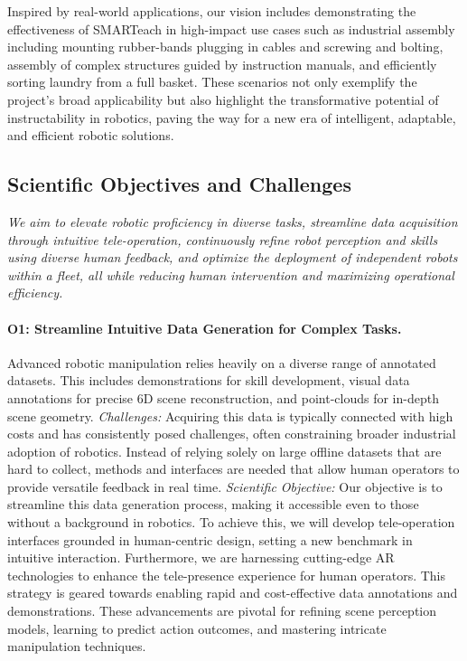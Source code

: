 \begin{refsection}
Inspired by real-world applications, our vision includes demonstrating the effectiveness of SMARTeach in high-impact use cases such as industrial assembly including mounting rubber-bands plugging in cables and screwing and bolting, assembly of complex structures guided by instruction manuals, and efficiently sorting laundry from a full basket. These scenarios not only exemplify the project's broad applicability but also highlight the transformative potential of instructability in robotics, paving the way for a new era of intelligent, adaptable, and efficient robotic solutions.

\subsection{Scientific Objectives and Challenges}
\textit{We aim to elevate robotic proficiency in diverse tasks, streamline data acquisition through intuitive tele-operation, continuously refine robot perception and skills using diverse human feedback, and optimize the deployment of independent robots within a fleet, all while reducing human intervention and maximizing operational efficiency.}
\vspace{-0.1cm}

\paragraph{O1: Streamline Intuitive Data Generation for Complex Tasks.} Advanced robotic manipulation relies heavily on a diverse range of annotated datasets. This includes demonstrations for skill development, visual data annotations for precise 6D scene reconstruction, and point-clouds for in-depth scene geometry. \newline
\textit{Challenges:} Acquiring this data is typically connected with high costs and has consistently posed challenges, often constraining broader industrial adoption of robotics. Instead of relying solely on large offline datasets that are hard to collect, methods and interfaces are needed that allow human operators to provide versatile feedback in real time.\newline
\textit{Scientific Objective:} Our objective is to streamline this data generation process, making it accessible even to those without a background in robotics. To achieve this, we will develop tele-operation interfaces grounded in human-centric design, setting a new benchmark in intuitive interaction. Furthermore, we are harnessing cutting-edge AR technologies to enhance the tele-presence experience for human operators. This strategy is geared towards enabling rapid and cost-effective data annotations and demonstrations. These advancements are pivotal for refining scene perception models, learning to predict action outcomes, and mastering intricate manipulation techniques.
\vspace{-0.1cm}

\end{refsection}
